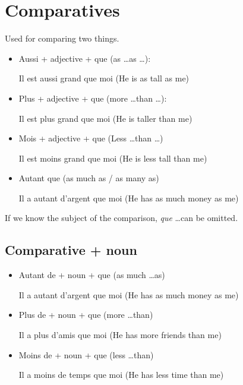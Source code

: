 \documentclass{book}
\begin{document}
\chapter{Comparatives}
    Used for comparing two things.
    \begin{itemize}
        \item Aussi + adjective + que (as \dots as \dots):
            \begin{center}
                Il est aussi grand que moi (He is as tall as me)
            \end{center}
        \item Plus + adjective + que (more \dots than \dots):
            \begin{center}
                Il est plus grand que moi (He is taller than me)
            \end{center}
        \item Mois + adjective + que (Less \dots than \dots)
            \begin{center}
                Il est moins grand que moi (He is less tall than me)
            \end{center}
        \item Autant que (as much as / as many as)
            \begin{center}
                Il a autant d'argent que moi (He has as much money as me)
            \end{center}
    \end{itemize}
    If we know the subject of the comparison, \textit{que} \dots can be omitted.

    \section{Comparative + noun}
        \begin{itemize}
            \item Autant de + noun + que (as much \dots as)
                \begin{center}
                    Il a autant d'argent que moi (He has as much money as me)
                \end{center}
            \item Plus de + noun + que (more \dots than)
                \begin{center}
                    Il a plus d'amis que moi (He has more friends than me)
                \end{center}
            \item Moins de + noun + que (less \dots than)
                \begin{center}
                    Il a moins de temps que moi (He has less time than me)
                \end{center}
        \end{itemize}
\end{document}
